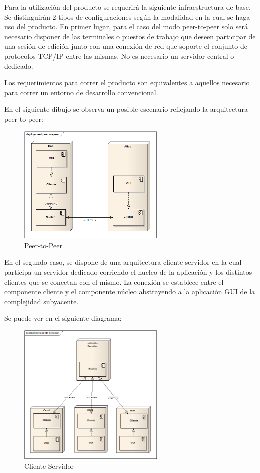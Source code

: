 \documentclass[12pt,a4paper]{article}
\begin{document}
Para la utilización del producto se requerirá la siguiente infraestructura de base.
Se distinguirán 2 tipos de configuraciones según la modalidad en la cual se haga uso del producto.
En primer lugar, para el caso del modo peer-to-peer solo será necesario disponer de las terminales o puestos de trabajo que deseen participar de una sesión de edición junto con una conexión de red que soporte el conjunto de protocolos TCP/IP entre las mismas. No es necesario un servidor central o dedicado.

Los requerimientos para correr el producto son equivalentes a aquellos necesario para correr un entorno de desarrollo convencional.

En el siguiente dibujo se observa un posible escenario reflejando la arquitectura peer-to-peer:


	\begin{figure}[H]
		\begin{center}
			\includegraphics[width=7cm]{peer-to-peer.png}
			\caption{\label{peer} Peer-to-Peer }
		\end{center}
	\end{figure}



En el segundo caso, se dispone de una arquitectura cliente-servidor en la cual participa un servidor dedicado corriendo el nucleo de la aplicación y los distintos clientes que se conectan con el mismo. La conexión se establece entre el componente cliente y el componente núcleo abstrayendo a la aplicación GUI de la complejidad subyacente.

Se puede ver en el siguiente diagrama:

	\begin{figure}[H]
		\begin{center}
			\includegraphics[width=7cm]{cliente-servidor.png}
			\caption{\label{server-client} Cliente-Servidor }
		\end{center}
	\end{figure}
\end{document}

